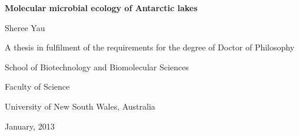 \begin{titlepage}
\begin{center}
\vspace*{1in}
\LARGE{\textbf{Molecular microbial ecology of Antarctic lakes}}
\par
\vspace{1.5in}
\LARGE{Sheree Yau}
\vfill
\par
\normalsize{A thesis in fulfilment of the requirements for the degree of Doctor of Philosophy}
\par
\vspace{0.5in}
\normalsize{School of Biotechnology and Biomolecular Sciences}
\par
\normalsize{Faculty of Science}
\par
\large{University of New South Wales, Australia}
\par
\vspace{0.5in}
\normalsize{January, 2013}
\par
\vspace{0.5in}
\end{center}
\end{titlepage}
